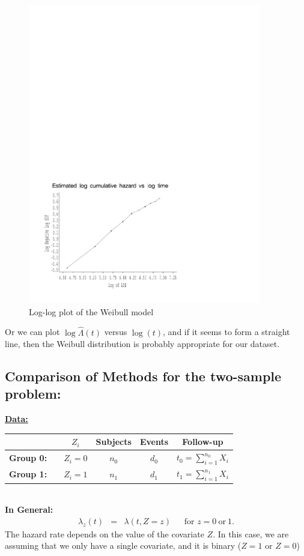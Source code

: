 \documentclass[11pt,psfig]{book}
\begin{document}
\begin{figure}[h!]
\caption{Log-log plot of the Weibull model}
\centerline{\includegraphics[width=4in]{nh_lls.pdf}}
\end{figure}
Or we can plot $\log\hat\Lambda(t)$ versus $\log(t)$,
and if it seems to form a straight line, then the Weibull
distribution is probably appropriate for our dataset.

\subsection{Comparison of Methods for the two-sample problem:}
\underline{\bf Data:}
\begin{center}
\begin{tabular}{lcccc}
\hline
& $Z_i$ & Subjects & Events & Follow-up \\ \hline
{\bf Group 0:}~~
& $Z_{i}= 0$ & $n_0$ & $d_0$ & $t_0=\sum_{i=1}^{n_0} X_i$\\[1ex]
{\bf Group 1:}
& $Z_{i}= 1$ & $n_1$ & $d_1$ & $t_1=\sum_{i=1}^{n_1} X_i$ \\ \hline
\end{tabular}
\end{center}
~\\[2ex]
{\bf In General:}
\begin{eqnarray*}
\lambda_z(t) & = & \lambda(t,Z=z) ~~~~~~~\mbox{for } z=0 ~\mbox{or}~ 1.
\end{eqnarray*}
The hazard rate depends on the value of the covariate $Z$.  In this case,
we are assuming that we only have a single covariate,  and it is
binary ($Z=1$ or $Z=0$)
\\[2ex]
\end{document}
